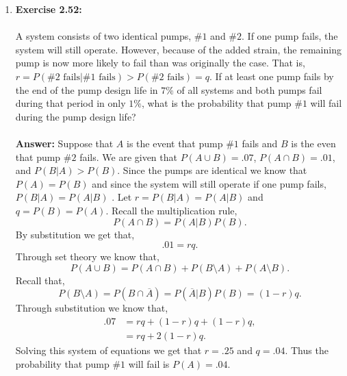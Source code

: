 \documentclass[12pt]{article}
\theoremstyle{homework}
\begin{document}
\begin{enumerate}
\item\hspace{.5in}\textbf{Exercise 2.52:} \\
\\
A system consists of two identical pumps, $\#1$ and $\#2$. If one pump fails, the system will still operate. However, because of the added strain, the remaining pump is now more likely to fail than was originally the case. That is, $r = P(\#2 \text{ fails} | \#1 \text{ fails})>P(\#2 \text{ fails}) = q$. If at least one pump fails by the end of the pump design life in $7\%$ of all systems and both pumps fail during that period in only $1\%$, what is the probability that pump $\#1$ will fail during the pump design life?\\
\\
 \textbf{Answer:} Suppose that $A$ is the event that pump $\#1$ fails and $B$ is the even that pump $\#2$ fails. We are given that $P(A \cup B) = .07$, $P(A \cap B) = .01$, and $P(B|A) > P(B)$. Since the pumps are identical we know that $P(A) = P(B)$ and since the system will still operate if one pump fails,  $P(B|A) = P(A|B)$ . Let $r = P(B|A) = P(A|B)$ and $q = P(B) = P(A)$. Recall the multiplication rule, 
 \begin{equation*}
   P(A \cap B) = P(A|B)P(B).
 \end{equation*}
By substitution we get that,
\begin{equation*}
  .01 = rq.
\end{equation*}
Through set theory we know that,
\begin{equation*}
  P(A \cup B) = P(A \cap B) + P(B\setminus A) + P(A \setminus B).
\end{equation*}
Recall that,
\begin{equation*}
  P(B\setminus A) = P(B\cap \overline{A}) = P(\overline{A}|B)P(B) = (1-r)q.
\end{equation*}
Through substitution we know that,
\begin{align*}
  .07 &= rq + (1-r)q + (1-r)q, \\
    &= rq + 2(1-r)q.
\end{align*}
Solving this system of equations we get that $r = .25$ and $q = .04$. Thus the probability that pump $\#1$ will fail is $P(A) = .04$.



\vspace{1in}



\end{enumerate}
\end{document}
